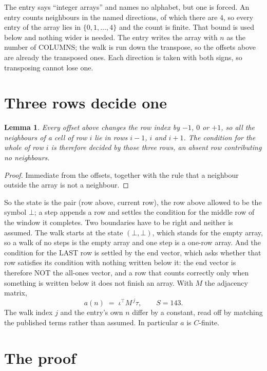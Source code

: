 \documentclass[11pt,a4paper]{article}
\theoremstyle{plain}
\newtheorem{lemma}[theorem]{Lemma}
\theoremstyle{definition}
\begin{document}
The entry says ``integer arrays'' and names no alphabet, but one is forced. An entry counts
neighbours in the named directions, of which there are $4$, so every entry of the array
lies in $\{0,1,\dots,4\}$ and the count is finite. That bound is used below and
nothing wider is needed. The entry writes the array with $n$ as the number of COLUMNS; the walk is run down the transpose, so the offsets above are already the transposed ones. Each direction is taken with both signs, so transposing cannot lose one.

\section{Three rows decide one}

\begin{lemma}\label{lem:win}
Every offset above changes the row index by $-1$, $0$ or $+1$, so all the neighbours of a cell
of row $i$ lie in rows $i-1$, $i$ and $i+1$. The condition for the whole of row $i$ is
therefore decided by those three rows, an absent row contributing no neighbours.
\end{lemma}

\begin{proof}
Immediate from the offsets, together with the rule that a neighbour outside the array is not a
neighbour.
\end{proof}

So the state is the pair (row above, current row), the row above allowed to be the symbol
$\bot$; a step appends a row and settles the condition for the middle row of the window it
completes. Two boundaries have to be right and neither is assumed. The walk starts at the state
$(\bot,\bot)$, which stands for the empty array, so a walk of no steps is the empty array and
one step is a one-row array. And the condition for the LAST row is settled by the end vector,
which asks whether that row satisfies its condition with nothing written below it: the end
vector is therefore NOT the all-ones vector, and a row that counts correctly only when
something is written below it does not finish an array. With $M$ the adjacency matrix,
\[
a(n)\;=\;\iota^{\!\top}M^{\,j}\tau ,\qquad S=143.
\]
The walk index $j$ and the entry's own $n$ differ by a constant, read off by matching the
published terms rather than assumed. In particular $a$ is $C$-finite.

\section{The proof}
\end{document}

